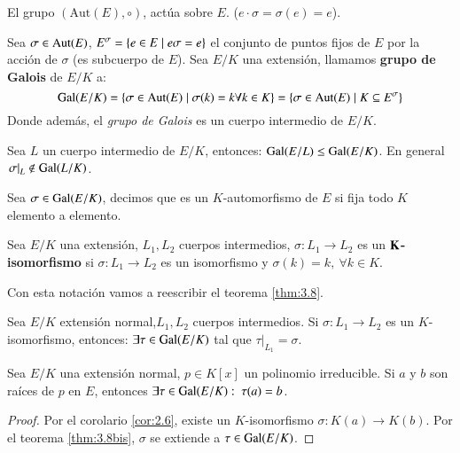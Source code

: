 El grupo $(\mathrm{Aut}(E), \circ)$, actúa sobre $E$. ($e \cdot \sigma = \sigma(e) = e$).

\begin{dfn}
Sea $\sigma \in \mathrm{Aut}(E)$, $E^\sigma = \left\{e \in E \mid e \sigma = e\right\}$ el conjunto de puntos fijos de $E$ por la acción de $\sigma$ (es subcuerpo de $E$). Sea $E/K$ una extensión, llamamos \textbf{grupo de Galois} de $E/K$ a:
$$
    \mathrm{Gal}(E/K) = \left\{\sigma \in \mathrm{Aut}(E) \mid \sigma(k) = k \forall k \in K\right\} = \left\{\sigma \in \mathrm{Aut}(E) \mid K \subseteq E^\sigma\right\}
$$
Donde además, el \textit{grupo de Galois} es un cuerpo intermedio de $E/K$.
\end{dfn}

\begin{pro}
Sea $L$ un cuerpo intermedio de $E/K$, entonces: $\mathrm{Gal}(E/L) \leq \mathrm{Gal}(E/K)$. En general $\left.\sigma\right|_L \notin \mathrm{Gal}(L/K)$.
\end{pro}

\begin{obs}[Notación]
    Sea $\sigma \in \mathrm{Gal}(E/K)$, decimos que es un $K$-automorfismo de $E$ si fija todo $K$ elemento a elemento.
\end{obs}

\begin{dfn}[$K$-isomorfismo]
    Sea $E/K$ una extensión, $L_1, L_2$ cuerpos intermedios, $\sigma: L_1 \to L_2$ es un $\mathbf{K}$\textbf{-isomorfismo} si $\sigma: L_1 \to L_2$ es un isomorfismo y $\sigma(k) = k,\ \forall k \in K$.
\end{dfn}

Con esta notación vamos a reescribir el teorema \ref{thm:3.8}.
\begin{thm}\label{thm:3.8bis}
    Sea $E/K$ extensión normal,$L_1, L_2$ cuerpos intermedios. Si $\sigma: L_1 \to L_2$ es un $K$-isomorfismo, entonces: $\exists \tau \in \mathrm{Gal}(E/K)$ tal que $\left. \tau \right|_{L_1} = \sigma$.
\end{thm}

\begin{cor} \label{cor:3.10}
    Sea $E/K$ una extensión normal, $p \in K[x]$ un polinomio irreducible. Si $a$ y $b$ son raíces de $p$ en $E$, entonces $\exists \tau \in \mathrm{Gal}(E/K):\ \tau(a) = b$.
\end{cor}
\begin{proof}
    Por el corolario \ref{cor:2.6}, existe un $K$-isomorfismo $\sigma: K(a) \to K(b)$. Por el teorema \ref{thm:3.8bis}, $\sigma$ se extiende a $\tau \in \mathrm{Gal}(E/K)$.
\end{proof}

